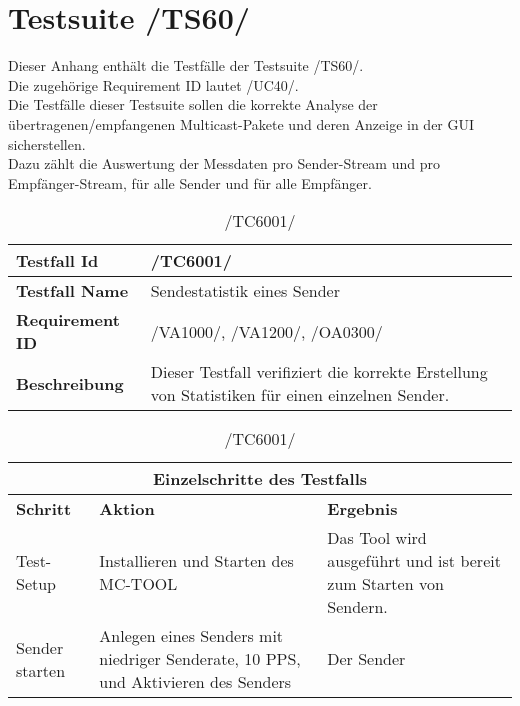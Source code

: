 \chapter{Testsuite /TS60/}
    
    Dieser Anhang enthält die Testfälle der Testsuite /TS60/.\\
    Die zugehörige Requirement ID lautet /UC40/.\\
    \newline
    Die Testfälle dieser Testsuite sollen die korrekte Analyse der
    übertragenen/empfangenen Multicast-Pakete und deren Anzeige in der GUI
    sicherstellen.\\
    Dazu zählt die Auswertung der Messdaten pro Sender-Stream und pro
    Empfänger-Stream, für alle Sender und für alle Empfänger.

    \begin{table}[h]
        \caption{/TC6001/}
        \label{tab:TC6001}
        \begin{center}
            \begin{tabular}{|p{3.5cm}|p{12cm}|}
                \hline
                    \textbf{Testfall Id} & /TC6001/\\
                \hline
                    \textbf{Testfall Name} & Sendestatistik eines Sender\\
                \hline
                    \textbf{Requirement ID} & /VA1000/, /VA1200/, /OA0300/\\
                \hline
                    \textbf{Beschreibung} & Dieser Testfall verifiziert die
                    korrekte Erstellung von Statistiken für einen einzelnen
                    Sender.\\
                \hline
            \end{tabular}
            \begin{tabular}{|p{2.5cm}|p{5cm}|p{7.55cm}|}
                \multicolumn{3}{|c|}{\textbf{Einzelschritte des Testfalls}} \\
                \hline
                    \textbf{Schritt} & \textbf{Aktion} & \textbf{Ergebnis}\\
                \hline
                    Test-Setup & Installieren und Starten des MC-TOOL & Das Tool
                    wird ausgeführt und ist bereit zum Starten von Sendern. \\
                \hline
                    Sender starten & Anlegen eines Senders mit niedriger
                    Senderate, 10 PPS, und Aktivieren des Senders & Der Sender

\end{tabular}
\end{center}
\end{table}
